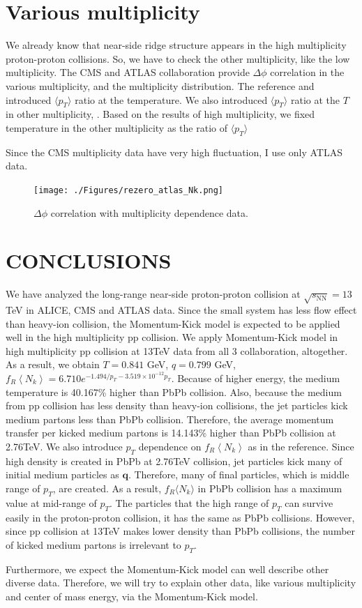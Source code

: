 \documentclass[jkps,fleqn,showpacs,showkeys]{revtex4}
\begin{document}
\section*{Various multiplicity}
\label{sec:Various multiplicity}

We already know that near-side ridge structure appears in the high multiplicity proton-proton collisions.
So, we have to check the other multiplicity, like the low multiplicity.
The CMS and ATLAS collaboration provide $\Delta \phi$ correlation in the various multiplicity, and the multiplicity distribution.
The reference \cite{Wong_5} and \cite{PbPb} introduced $\langle p_T \rangle$ ratio at the temperature.
We also introduced $\langle p_T \rangle$ ratio at the $T$ in other multiplicity, .
Based on the results of high multiplicity, we fixed temperature in the other multiplicity as the ratio of $\langle p_T \rangle$

Since the CMS multiplicity data have very high fluctuation, I use only ATLAS data.
\begin{figure}[ht]
\centering
\texttt{[image: ./Figures/rezero\_atlas\_Nk.png]}
\caption{$\Delta \phi$ correlation with multiplicity dependence data.}
\label{figure:multiplicity}
\end{figure}
    



\section*{CONCLUSIONS}
\label{sec:Conclusion}


We have analyzed the long-range near-side proton-proton collision at $\sqrt{s_\text{NN}}=13$TeV in ALICE, CMS and ATLAS data. 
Since the small system has less flow effect than heavy-ion collision, the Momentum-Kick model is expected to be applied well in the high multiplicity pp collision.
We apply Momentum-Kick model in high multiplicity pp collision at 13TeV data from all 3 collaboration, altogether. 
As a result, we obtain $T=0.841$ GeV, $q=0.799$ GeV, $f_R\left\langle N_k\right\rangle = 6.710e^{-1.494/p_T-3.519\times10^{-12}p_T}$.
Because of higher energy, the medium temperature is 40.167\% higher than PbPb collision.
Also, because the medium from pp collision has less density than heavy-ion collisions, the jet particles kick medium partons less than PbPb collision.
Therefore, the average momentum transfer per kicked medium partons is 14.143\% higher than PbPb collision at 2.76TeV.
We also introduce $p_T$ dependence on $f_R\left\langle N_k\right\rangle$ as in the reference\cite{PbPb}.
Since high density is created in PbPb at 2.76TeV collision, jet particles kick many of initial medium particles as $\textbf{q}$.
Therefore, many of final particles, which is middle range of $p_T$, are created.
As a result, $f_R \langle N_k \rangle$ in PbPb collision has a maximum value at mid-range of $p_T$.
The particles that the high range of $p_T$ can survive easily in the proton-proton collision, it has the same as PbPb collisions.
However, since pp collision at 13TeV makes lower density than PbPb collisions, the number of kicked medium partons is irrelevant to $p_T$.

Furthermore, we expect the Momentum-Kick model can well describe other diverse data.
Therefore, we will try to explain other data, like various multiplicity and center of mass energy, via the Momentum-Kick model.

\end{document}
